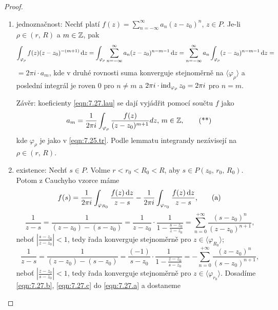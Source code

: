 \begin{proof}

\begin{enumerate}
 \item jednoznačnost: Nechť platí $f(z)=\sum\limits_{n=-\infty}^\infty a_n(z-z_0)^n$, $z \in P$. Je-li $\rho \in (r,\,R)$ a $m \in \operatorname{\mathbb{Z}} $, pak 
$$
\int_{\varphi_\rho}f(z)(z-z_0)^{-(m+1)} \mathop{}\!\mathrm{d} z = \int_{\varphi_\rho} \sum\limits_{n=-\infty}^{\infty} a_n(z-z_0)^{n-m-1} \mathop{}\!\mathrm{d} z = \sum\limits_{n=-\infty}^{\infty} a_n \int_{\varphi_\rho}(z-z_0)^{n-m-1} \mathop{}\!\mathrm{d} z = 
$$
$=2\pi i \cdot a_m$, kde v druhé rovnosti suma konverguje stejnoměrně na $\langle\varphi_\rho \rangle$ a poslední integrál je roven $0$ pro $n \neq m$ a $2\pi i \cdot \operatorname{ind}_{\varphi_\rho}z_0=2\pi i$ pro $n=m$.

Závěr: koeficienty \cref{eqn:7.27.lau} se dají vyjádřit pomocí součtu $f$ jako 
\begin{equation}
    a_m=\frac{1}{2 \pi i}\int_{\varphi_\rho}\frac{f(z)}{(z-z_0)^{m+1}} dz\text{, } m \in \operatorname{\mathbb{Z}} , 
    \tag{**}
    \label{eqn:7.27.**}
\end{equation}
kde $\varphi_\rho$ je jako v \cref{eqn:7.25.tr}. Podle lemmatu integrandy nezávisejí na $\rho \in (r,\,R)$.
\item existence: Nechť $s \in P$. Volme $r<r_0<R_0<R$, aby $s \in P(z_0,\,r_0,\,R_0)$. Potom z Cauchyho vzorce máme \begin{equation}
    f(s)=\frac{1}{2 \pi i}\int_{\varphi_{R_0}}\frac{f(z) \mathop{}\!\mathrm{d} z}{z-s}-\frac{1}{2 \pi i}\int_{\varphi_{r_0}}\frac{f(z) \mathop{}\!\mathrm{d} z}{z-s}\text{,}
    \tag{a}
    \label{eqn:7.27.a}
\end{equation}
\begin{equation}
    \frac{1}{z-s}=\frac{1}{(z-z_0)-(s-z_0)}=\frac{1}{z-z_0}\cdot \frac{1}{1-\frac{s-z_0}{z-z_0}}=\sum\limits_{n=0}^{+\infty}\frac{(s-z_0)^n}{(z-z_0)^{n+1}}\text{,}
    \tag{b}
    \label{eqn:7.27.b}
\end{equation}
neboť $\left|\frac{s-z_0}{z-z_0}\right|<1$, tedy řada konverguje stejnoměrně pro $z \in \langle\varphi_{R_0} \rangle$;
\begin{equation}
    \frac{1}{z-s}=\frac{1}{(z-z_0)-(s-z_0)}=\frac{(-1)}{s-z_0}\cdot \frac{1}{1-\frac{z-z_0}{s-z_0}}=-\sum\limits_{n=0}^{+\infty}\frac{(z-z_0)^n}{(s-z_0)^{n+1}}\text{,}
    \tag{c}
    \label{eqn:7.27.c}   
\end{equation}
neboť $\left|\frac{z-z_0}{s-z_0}\right|<1$, tedy řada konverguje stejnoměrně pro $z \in \langle\varphi_{r_0} \rangle$.
Dosadíme \cref{eqn:7.27.b}, \cref{eqn:7.27.c} do \cref{eqn:7.27.a} a dostaneme

\end{enumerate}
\end{proof}
